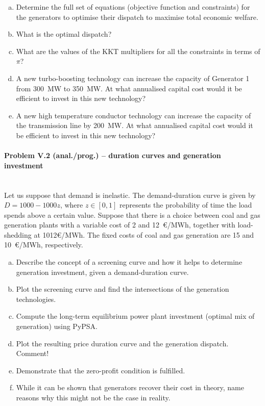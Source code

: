\documentclass[11pt,a4paper,fleqn]{scrartcl}
\begin{document}
\begin{enumerate}[(a)]
 \item Determine the full set of equations (objective function and
       constraints) for the generators to optimise their dispatch to
       maximise total economic welfare.
 \item What is the optimal dispatch?
 \item What are the values of the KKT multipliers for all the constraints in terms of $\pi$?
 \item A new turbo-boosting technology can increase the capacity of Generator 1 from 300~MW to 350~MW.  At what annualised capital cost would it be efficient to invest in this new technology?
 \item A new high temperature conductor technology can increase the capacity of the transmission line by 200~MW. At what annualised capital cost would it be efficient to invest in this new technology?
\end{enumerate}

\newpage
\paragraph{Problem V.2 (anal./prog.) -- duration curves and generation investment}~\\

Let us suppose that demand is inelastic. The demand-duration curve is given by $D=1000-1000z$, where $z\in [0,1]$ represents the probability of time the load spends above a certain value. Suppose that there is a choice between coal and gas generation plants with a variable cost of 2 and 12~\euro/MWh, together with load-shedding at 1012\euro/MWh. The fixed costs of coal and gas generation are 15 and 10~\euro/MWh, respectively.

\begin{enumerate}[(a)]
 \item Describe the concept of a screening curve and how it helps to determine generation investment, given a demand-duration curve.
 \item Plot the screening curve and find the intersections of the generation technologies.
 \item Compute the long-term equilibrium power plant investment (optimal mix of generation) using PyPSA.
 \item Plot the resulting price duration curve and the generation dispatch. Comment!
 \item Demonstrate that the zero-profit condition is fulfilled.
 \item While it can be shown that generators recover their cost in theory, name reasons why this might not be the case in reality.
\end{enumerate}
\end{document}
